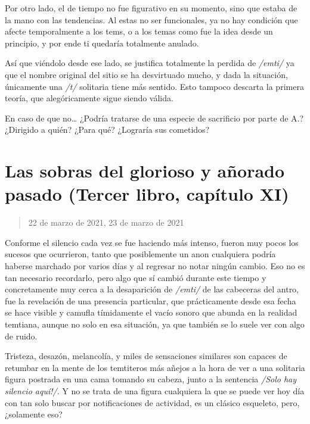 \documentclass[
]{book}
\begin{document}
Por otro lado, el de tiempo no fue figurativo en su momento, sino que estaba de la mano con las tendencias. Al estas no ser funcionales, ya no hay condición que afecte temporalmente a los tems, o a los temas como fue la idea desde un principio, y por ende ti quedaría totalmente anulado.

Así que viéndolo desde ese lado, se justifica totalmente la perdida de \emph{/emti/} ya que el nombre original del sitio se ha desvirtuado mucho, y dada la situación, únicamente una \emph{/t/} solitaria tiene más sentido. Esto tampoco descarta la primera teoría, que alegóricamente sigue siendo válida.

En caso de que no\ldots{} ¿Podría tratarse de una especie de sacrificio por parte de A.? ¿Dirigido a quién? ¿Para qué? ¿Lograría sus cometidos?

\hypertarget{las-sobras-del-glorioso-y-auxf1orado-pasado-tercer-libro-capuxedtulo-xi}{%
\section{Las sobras del glorioso y añorado pasado (Tercer libro, capítulo XI)}\label{las-sobras-del-glorioso-y-auxf1orado-pasado-tercer-libro-capuxedtulo-xi}}

\begin{quote}
22 de marzo de 2021, 23 de marzo de 2021
\end{quote}

Conforme el silencio cada vez se fue haciendo más intenso, fueron muy pocos los sucesos que ocurrieron, tanto que posiblemente un anon cualquiera podría haberse marchado por varios días y al regresar no notar ningún cambio. Eso no es tan necesario recordarlo, pero algo que sí cambió durante este tiempo y concretamente muy cerca a la desaparición de \emph{/emti/} de las cabeceras del antro, fue la revelación de una presencia particular, que prácticamente desde esa fecha se hace visible y camufla tímidamente el vacío sonoro que abunda en la realidad temtiana, aunque no solo en esa situación, ya que también se lo suele ver con algo de ruido.

Tristeza, desazón, melancolía, y miles de sensaciones similares son capaces de retumbar en la mente de los temtiteros más añejos a la hora de ver a una solitaria figura postrada en una cama tomando su cabeza, junto a la sentencia \emph{/Solo hay silencio aquí!/}. Y no se trata de una figura cualquiera la que se puede ver hoy día con tan solo buscar por notificaciones de actividad, es un clásico esqueleto, pero, ¿solamente eso?
\end{document}
